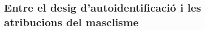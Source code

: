 \begin{comment}
Unsortiert
----------
skipping school
"Ens vàrem abraçar durant unes hores en què jo havia d'estar a matemàtiques, a filosofia, a literatura, a tutoria. No era la primera vegada, l'amiga número dos havia explicat a la tutora que saps què passa que el seu pare no la vol deixar continuar a l'institut i, és clar, hi haurà dies en què potser o podrà ni venir, però diu que és pitjor si aviseu a casa seva, que llavors ell es posa molt furiós i li pega i tot." (p.296)
--die vorurteile ausnutzen

\end{comment}

\begin{comment}
--hier oder Unterkapitel "intertextualitaet" oder aehnlich in language

Qui es català?

* estereotips: die Mutter kann und tut nur putzen und kochen und ihren Mann gehorchen obwohl er sich ungeheuerlich verhaelt; der Vater ist richtig ueberzogen als Arsch dargestellt, der seine Familie schlaegt, rumvoegelt und absurde Vorstellungen von Ehre, Ehe und Familie hat;
--> vlt sind die stereotypen so überzogen um den inneren (und äußeren) konflikt noch drastischer hervorzuheben?
    vlt auch um ihre Absurdität aufzuzeigen?

"Jo hi volia anar, a veure Isabel [...] i així podria saber quina cara feia una dona com aquella. Lletja, segur. Havia de ser lletja i pudent, com havia dit la mare tantes vegades que eren les dones que mengen porc." (p.185)
--estereotips (dones cristianes, dones musulmanes, gegen einander ausgespielt)

"La mare sempre deia que hauries d'estar fent això o hauries d'estar fent allò altre i jo ja havia vist que les nenes de la meva edat no sabien ni agafar bé una escombra i que no tenien cap interès a aprendre'n." (p.239)
-- entre cultures: com són les amigues

\end{comment}

\subsection{Entre el desig d'autoidentificació i les atribucions del masclisme}

\begin{comment}
  1) autoidentificació
  buscant la seva identitat
  * religió
  * literatura

  2) les atribucions
  * com han de ser les nenes/les dones?
    ** alleine fuer die ganze care arbeit zustaendig, wird als natuerliche neigung inszeniert
  * les dones i les "altres" són culpables per tot (vgl Laurie Penny)
    --> keine Solidaritaet zwischen den Frauen (zb la mare i les amants) moeglich, obwohl sie alle Opfer sind; sie werden gegen einander ausgespielt
  * frauen werden auf ihr aeusseres reduziert
  * die frauen wuerden nie genuegen;
\end{comment}


